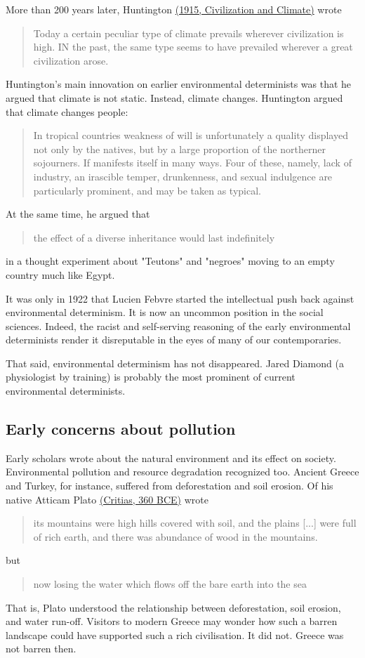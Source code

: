 More than 200 years later, Huntington \href{https://www.questia.com/read/9043355/civilization-and-climate}{(1915, Civilization and Climate)} wrote
\begin{quote}
    Today a certain peculiar type of climate prevails wherever civilization is high. IN the past, the same type seems to have prevailed wherever a great civilization arose.
\end{quote}
Huntington's main innovation on earlier environmental determinists was that he argued that climate is not static. Instead, climate changes. Huntington argued that climate changes people:
\begin{quote}
    In tropical countries weakness of will is unfortunately a quality displayed not only by the natives, but by a large proportion of the northerner sojourners. If manifests itself in many ways. Four of these, namely, lack of industry, an irascible temper, drunkenness, and sexual indulgence are particularly prominent, and may be taken as typical.
\end{quote}
At the same time, he argued that
\begin{quote}
    the effect of a diverse inheritance would last indefinitely
\end{quote}
in a thought experiment about "Teutons" and "negroes" moving to an empty country much like Egypt.

It was only in 1922 that Lucien Febvre started the intellectual push back against environmental determinism. It is now an uncommon position in the social sciences. Indeed, the racist and self-serving reasoning of the early environmental determinists render it disreputable in the eyes of many of our contemporaries.

That said, environmental determinism has not disappeared. Jared Diamond (a physiologist by training) is probably the most prominent of current environmental determinists.

\subsection{Early concerns about pollution}
Early scholars wrote about the natural environment and its effect on society. Environmental pollution and resource degradation recognized too. Ancient Greece and Turkey, for instance, suffered from deforestation and soil erosion. Of his native Atticam Plato \href{http://classics.mit.edu/Plato/critias.html}{(Critias, 360 BCE)} wrote
\begin{quote}
    its mountains were high hills covered with soil, and the plains [...] were full of rich earth, and there was abundance of wood in the mountains.
\end{quote}
but
\begin{quote}
   now losing the water which flows off the bare earth into the sea 
\end{quote}
That is, Plato understood the relationship between deforestation, soil erosion, and water run-off. Visitors to modern Greece may wonder how such a barren landscape could have supported such a rich civilisation. It did not. Greece was not barren then.

